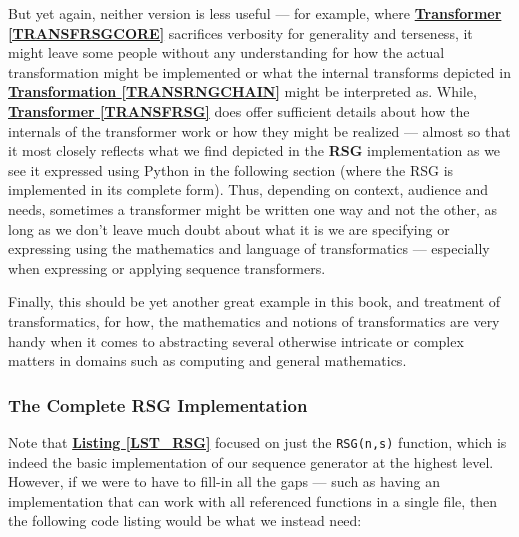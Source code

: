 \documentclass[a4paper, 18pt]{book} %
\begin{document}
But yet again, neither version is less useful --- for example, where \textbf{\hyperref[TRANSFRSGCORE]{Transformer \ref{TRANSFRSGCORE}}} sacrifices verbosity for generality and terseness, it might leave some people without any understanding for how the actual transformation might be implemented or what the internal transforms depicted in \textbf{\hyperref[TRANSRNGCHAIN]{Transformation \ref{TRANSRNGCHAIN}}} might be interpreted as. While, \textbf{\hyperref[TRANSFRSG]{Transformer \ref{TRANSFRSG}}} does offer sufficient details about how the internals of the transformer work or how they might be realized --- almost so that it most closely reflects what we find depicted in the \textbf{RSG} implementation as we see it expressed using Python in the following section (where the RSG is implemented in its complete form). Thus, depending on context, audience and needs, sometimes a transformer might be written one way and not the other, as long as we don't leave much doubt about what it is we are specifying or expressing using the mathematics and language of transformatics --- especially when expressing or applying sequence transformers. 

Finally, this should be yet another great example in this book, and treatment of transformatics, for how, the mathematics and notions of transformatics are very handy when it comes to abstracting several otherwise intricate or complex matters in domains such as computing and general mathematics.


\newpage

\subsubsection{The Complete RSG Implementation}

Note that \textbf{\hyperref[LST_RSG]{Listing \ref{LST_RSG}}} focused on just the \texttt{RSG(n,s)} function, which is indeed the basic implementation of our sequence generator at the highest level. However, if we were to have to fill-in all the gaps --- such as having an implementation that can work with all referenced functions in a single file, then the following code listing would be what we instead need:

\vspace{1em}
\end{document}
